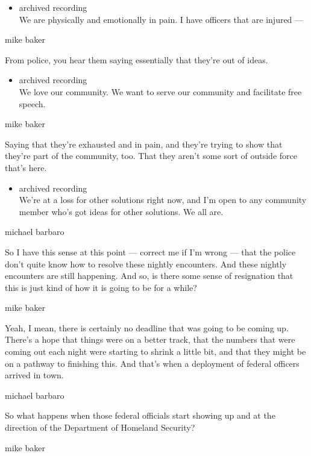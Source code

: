\begin{itemize}
\tightlist
\item
  archived recording\\
  We are physically and emotionally in pain. I have officers that are
  injured ---
\end{itemize}

mike baker

From police, you hear them saying essentially that they're out of ideas.

\begin{itemize}
\tightlist
\item
  archived recording\\
  We love our community. We want to serve our community and facilitate
  free speech.
\end{itemize}

mike baker

Saying that they're exhausted and in pain, and they're trying to show
that they're part of the community, too. That they aren't some sort of
outside force that's here.

\begin{itemize}
\tightlist
\item
  archived recording\\
  We're at a loss for other solutions right now, and I'm open to any
  community member who's got ideas for other solutions. We all are.
\end{itemize}

michael barbaro

So I have this sense at this point --- correct me if I'm wrong --- that
the police don't quite know how to resolve these nightly encounters. And
these nightly encounters are still happening. And so, is there some
sense of resignation that this is just kind of how it is going to be for
a while?

mike baker

Yeah, I mean, there is certainly no deadline that was going to be coming
up. There's a hope that things were on a better track, that the numbers
that were coming out each night were starting to shrink a little bit,
and that they might be on a pathway to finishing this. And that's when a
deployment of federal officers arrived in town.

michael barbaro

So what happens when those federal officials start showing up and at the
direction of the Department of Homeland Security?

mike baker

